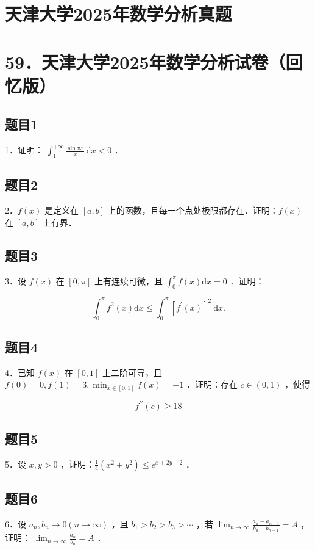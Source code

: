 \documentclass{article}
\begin{document}
\section*{天津大学2025年数学分析真题}
\section*{59．天津大学2025年数学分析试卷（回忆版）}

\subsection{题目1}
1．证明： \(\int_{1}^{+\infty} \frac{\sin \pi x}{x} \mathrm{~d} x<0\) ．

\subsection{题目2}
2．\(f(x)\) 是定义在 \([a, b]\) 上的函数，且每一个点处极限都存在．证明：\(f(x)\) 在 \([a, b]\) 上有界．

\subsection{题目3}
3．设 \(f(x)\) 在 \([0, \pi]\) 上有连续可微，且 \(\int_{0}^{\pi} f(x) \mathrm{d} x=0\) ．证明：

\[
\int_{0}^{\pi} f^{2}(x) \mathrm{d} x \leq \int_{0}^{\pi}\left[f^{\prime}(x)\right]^{2} \mathrm{~d} x .
\]

\subsection{题目4}
4．已知 \(f(x)\) 在 \([0,1]\) 上二阶可导，且 \(f(0)=0, f(1)=3, \min _{x \in[0,1]} f(x)=-1\) ．证明：存在 \(c \in(0,1)\) ，使得

\[
f^{\prime \prime}(c) \geq 18
\]

\subsection{题目5}
5．设 \(x, y>0\) ，证明：\(\frac{1}{4}\left(x^{2}+y^{2}\right) \leq e^{x+2 y-2}\) ．

\subsection{题目6}
6．设 \(a_{n}, b_{n} \rightarrow 0(n \rightarrow \infty)\) ，且 \(b_{1}>b_{2}>b_{3}>\cdots\) ，若 \(\lim _{n \rightarrow \infty} \frac{a_{n}-a_{n-1}}{b_{n}-b_{n-1}}=A\) ，证明： \(\lim _{n \rightarrow \infty} \frac{a_{n}}{b_{n}}=A\) ．
\end{document}

